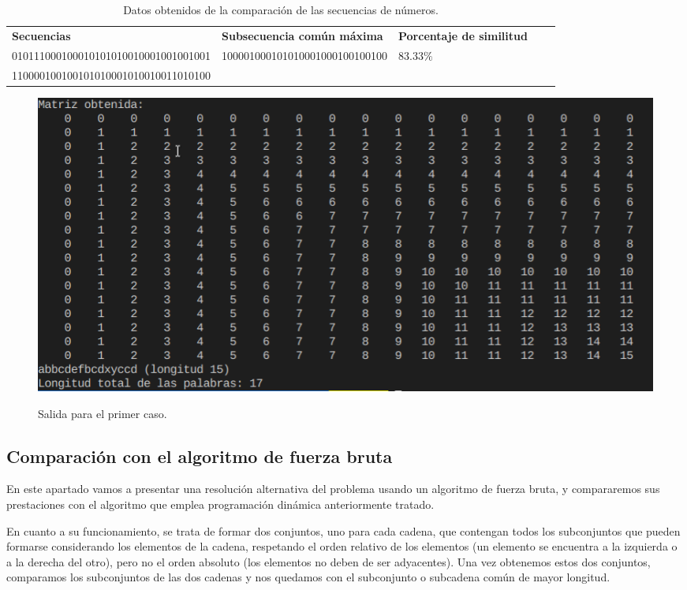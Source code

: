 \begin{table}[h]
  \footnotesize
  \centering
\begin{tabular}{|l|l|l|ll}
  \cline{1-3}
  \textbf{Secuencias}                           & \textbf{Subsecuencia común máxima}                       & \textbf{Porcentaje de similitud}     &  &  \\ \cline{1-3}
  010111000100010101010010001001001001 & \multirow{2}{*}{100001000101010001000100100100} & \multirow{2}{*}{$83.33 \%$} &  &  \\ \cline{1-1}
  110000100100101010001010010011010100 &                                                 &                             &  &  \\ \cline{1-3}
\end{tabular}
\caption{Datos obtenidos de la comparación de las secuencias de números.}
\label{tab:s2}
\end{table}

\begin{figure}
  \centering
  \caption{Salida para el primer caso.}
  \includegraphics[scale=0.67]{img/LettersMatrixResult.png}
  \label{fig:1}
\end{figure}

\subsection{Comparación con el algoritmo de fuerza bruta}

En este apartado vamos a presentar una resolución alternativa del problema
usando un algoritmo de fuerza bruta, y compararemos sus prestaciones con el
algoritmo que emplea programación dinámica anteriormente tratado.

En cuanto a su funcionamiento, se trata de formar dos conjuntos, uno para cada cadena, que contengan todos los subconjuntos que pueden formarse considerando los elementos de la cadena, respetando el orden relativo de los elementos (un elemento se encuentra a la izquierda o a la derecha del otro), pero no el orden absoluto (los elementos no deben de ser adyacentes). Una vez obtenemos estos dos conjuntos, comparamos los subconjuntos de las dos cadenas y nos quedamos con el subconjunto 
o subcadena común de mayor longitud.

